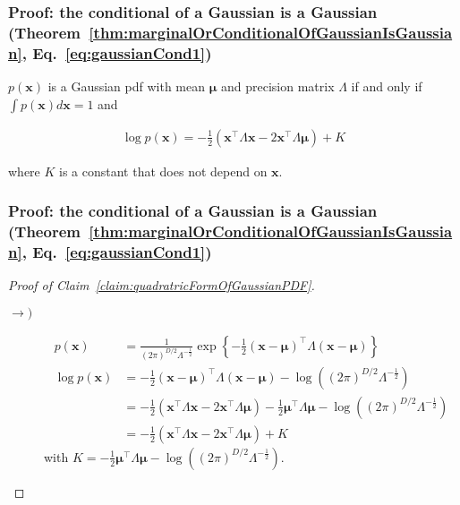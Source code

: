 \begin{frame}
    \frametitle{Proof: the conditional of a Gaussian is a Gaussian (Theorem~\ref{thm:marginalOrConditionalOfGaussianIsGaussian}, Eq.~\ref{eq:gaussianCond1})}

	\begin{claim}
		\label{claim:quadratricFormOfGaussianPDF}

		$p(\mathbf{x})$ is a Gaussian pdf with mean $\boldsymbol{\mu}$ and precision matrix $\Lambda$ if and only if $\int p(\mathbf{x}) d\mathbf{x}=1$ and

		\begin{align}
			\log p(\mathbf{x})=-\frac{1}{2}(\mathbf{x}^\intercal\Lambda\mathbf{x}-2\mathbf{x}^\intercal\Lambda\boldsymbol{\mu})+K\label{eq:gaussianQuadratic}
		\end{align}

		where $K$ is a constant that does not depend on $\mathbf{x}$.

	\end{claim}

\end{frame}

\begin{frame}
    \frametitle{Proof: the conditional of a Gaussian is a Gaussian (Theorem~\ref{thm:marginalOrConditionalOfGaussianIsGaussian}, Eq.~\ref{eq:gaussianCond1})}

	\begin{proof}[Proof of Claim~\ref{claim:quadratricFormOfGaussianPDF}]

		\scriptsize
		\begin{description}
			\item[$\rightarrow)$]

				\begin{align*}
					p(\mathbf{x})&=\frac{1}{(2\pi)^{D/2}\Lambda^{-\frac{1}{2}}}\exp\left\{-\frac{1}{2}(\mathbf{x}-\boldsymbol{\mu})^\intercal\Lambda(\mathbf{x}-\boldsymbol{\mu})\right\}\\
					\log p(\mathbf{x})&=-\frac{1}{2}(\mathbf{x}-\boldsymbol{\mu})^\intercal\Lambda(\mathbf{x}-\boldsymbol{\mu})-\log ((2\pi)^{D/2}\Lambda^{-\frac{1}{2}})\\
					                  &=-\frac{1}{2}(\mathbf{x}^\intercal\Lambda\mathbf{x}-2\mathbf{x}^\intercal\Lambda\boldsymbol{\mu})-\frac{1}{2}\boldsymbol{\mu}^\intercal\Lambda\boldsymbol{\mu}-\log ((2\pi)^{D/2}\Lambda^{-\frac{1}{2}})\\
					                  &=-\frac{1}{2}(\mathbf{x}^\intercal\Lambda\mathbf{x}-2\mathbf{x}^\intercal\Lambda\boldsymbol{\mu})+K
				\end{align*}
				with $K=-\frac{1}{2}\boldsymbol{\mu}^\intercal\Lambda\boldsymbol{\mu}-\log ((2\pi)^{D/2}\Lambda^{-\frac{1}{2}})$.
				\phantom\qedhere
		\end{description}
		\normalsize
	\end{proof}
\end{frame}

